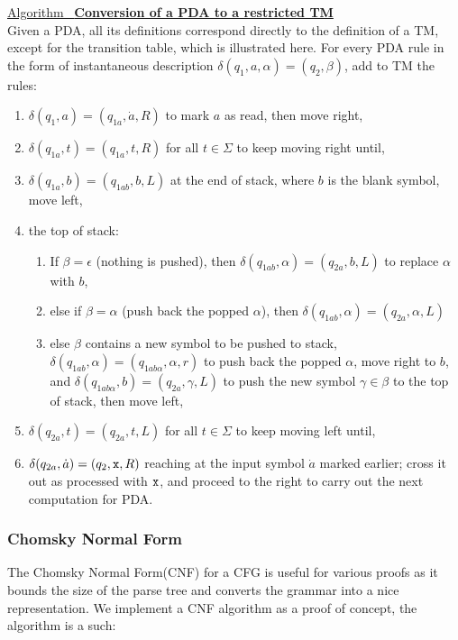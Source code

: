 \documentclass[12pt]{article}  %
\newcommand{\algtitle}[1]{\underline{Algorithm \ {\bf #1}} \vspace*{1mm}\\}
\begin{document}
\algtitle{Conversion of a PDA to a restricted TM}
Given a PDA, all its definitions correspond directly to the definition of a TM, except for the transition table, which is illustrated here. For every PDA rule in the form of instantaneous description $\delta(q_1, a, \alpha) = (q_2, \beta)$, add to TM the rules:
\begin{enumerate}
	\item $\delta(q_1, a) = (q_{1a}, \dot a, R)$ to mark $a$ as read, then move right,
	\item $\delta(q_{1a}, t) = (q_{1a}, t, R)$ for all $t \in \Sigma$ to keep moving right until,
	\item $\delta(q_{1a}, b) = (q_{1ab}, b, L)$ at the end of stack, where $b$ is the blank symbol, move left,
	\item the top of stack:
	\begin{enumerate}
		\item If $\beta = \epsilon$ (nothing is pushed), then $\delta(q_{1ab}, \alpha) = (q_{2a}, b, L)$ to replace $\alpha$ with $b$,
		\item else if $\beta = \alpha$ (push back the popped $\alpha$), then $\delta(q_{1ab}, \alpha) = (q_{2a}, \alpha, L)$
		\item else $\beta$ contains a new symbol to be pushed to stack, $\delta(q_{1ab}, \alpha) = (q_{1ab\alpha}, \alpha, r)$ to push back the popped $\alpha$, move right to $b$, and $\delta(q_{1ab\alpha}, b) = (q_{2a}, \gamma, L)$ to push the new symbol $\gamma \in \beta$ to the top of stack, then move left,
	\end{enumerate}
	\item $\delta(q_{2a}, t) = (q_{2a}, t, L)$ for all $t \in \Sigma$ to keep moving left until,
	\item $\delta(q_{2a}, \dot a) = (q_{2}, {\tt x}, R)$ reaching at the input symbol $\dot a$ marked earlier; cross it out as processed with ${\tt x}$, and proceed to the right to carry out the next computation for PDA.	
\end{enumerate}




\subsubsection{Chomsky Normal Form}
The Chomsky Normal Form(CNF) for a CFG is useful for various proofs as it bounds the size of the parse tree and converts the grammar into a nice representation. We implement a CNF algorithm as a proof of concept, the algorithm is a such:
\end{document}

